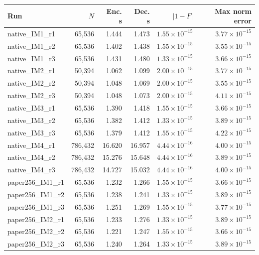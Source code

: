 \begin{center}
{\footnotesize
\setlength{\tabcolsep}{4pt}
\begin{tabular}{@{}lrrrrr@{}}
\toprule
Run & $N$ & Enc. s & Dec. s & $|1-F|$ & Max norm error \\
\midrule
native\_IM1\_r1 & 65,536 & 1.444 & 1.473 & $1.55\times10^{-15}$ & $3.77\times10^{-15}$ \\
native\_IM1\_r2 & 65,536 & 1.402 & 1.438 & $1.55\times10^{-15}$ & $3.55\times10^{-15}$ \\
native\_IM1\_r3 & 65,536 & 1.431 & 1.480 & $1.33\times10^{-15}$ & $3.66\times10^{-15}$ \\
native\_IM2\_r1 & 50,394 & 1.062 & 1.099 & $2.00\times10^{-15}$ & $3.77\times10^{-15}$ \\
native\_IM2\_r2 & 50,394 & 1.048 & 1.069 & $2.00\times10^{-15}$ & $3.55\times10^{-15}$ \\
native\_IM2\_r3 & 50,394 & 1.048 & 1.073 & $2.00\times10^{-15}$ & $4.11\times10^{-15}$ \\
native\_IM3\_r1 & 65,536 & 1.390 & 1.418 & $1.55\times10^{-15}$ & $3.66\times10^{-15}$ \\
native\_IM3\_r2 & 65,536 & 1.382 & 1.412 & $1.33\times10^{-15}$ & $3.89\times10^{-15}$ \\
native\_IM3\_r3 & 65,536 & 1.379 & 1.412 & $1.55\times10^{-15}$ & $4.22\times10^{-15}$ \\
native\_IM4\_r1 & 786,432 & 16.620 & 16.957 & $4.44\times10^{-16}$ & $4.00\times10^{-15}$ \\
native\_IM4\_r2 & 786,432 & 15.276 & 15.648 & $4.44\times10^{-16}$ & $3.89\times10^{-15}$ \\
native\_IM4\_r3 & 786,432 & 14.727 & 15.032 & $4.44\times10^{-16}$ & $4.00\times10^{-15}$ \\
paper256\_IM1\_r1 & 65,536 & 1.232 & 1.266 & $1.55\times10^{-15}$ & $3.66\times10^{-15}$ \\
paper256\_IM1\_r2 & 65,536 & 1.238 & 1.241 & $1.33\times10^{-15}$ & $3.89\times10^{-15}$ \\
paper256\_IM1\_r3 & 65,536 & 1.251 & 1.269 & $1.55\times10^{-15}$ & $3.77\times10^{-15}$ \\
paper256\_IM2\_r1 & 65,536 & 1.233 & 1.276 & $1.33\times10^{-15}$ & $3.89\times10^{-15}$ \\
paper256\_IM2\_r2 & 65,536 & 1.221 & 1.247 & $1.55\times10^{-15}$ & $3.66\times10^{-15}$ \\
paper256\_IM2\_r3 & 65,536 & 1.240 & 1.264 & $1.33\times10^{-15}$ & $3.89\times10^{-15}$ \\

\end{tabular}}
\end{center}
